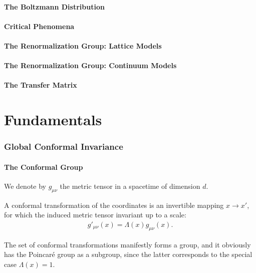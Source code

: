 \documentclass[10pt]{article}
\begin{document}
\subsection{The Boltzmann Distribution}
\subsection{Critical Phenomena}
\subsection{The Renormalization Group: Lattice Models}
\subsection{The Renormalization Group: Continuum Models}
\subsection{The Transfer Matrix}

\part{Fundamentals}
\section{Global Conformal Invariance}
\subsection{The Conformal Group}
We denote by $g_{\mu\nu}$ the metric tensor in a spacetime of dimension $d$.
\begin{definition}
    A conformal transformation of the coordinates is an invertible mapping $x\to x'$, for which the induced metric tensor invariant up to a scale:
    \begin{align}
        g'_{\mu\nu}(x)=\Lambda(x)g_{\mu\nu}(x).\label{eq:ct:conformal_transformation}
    \end{align}
\end{definition}
The set of conformal transformations manifestly forms a group, and it obviously has the Poincar\'{e} group as a subgroup, since the latter corresponds to the special case $\Lambda(x)=1$.
\end{document}
